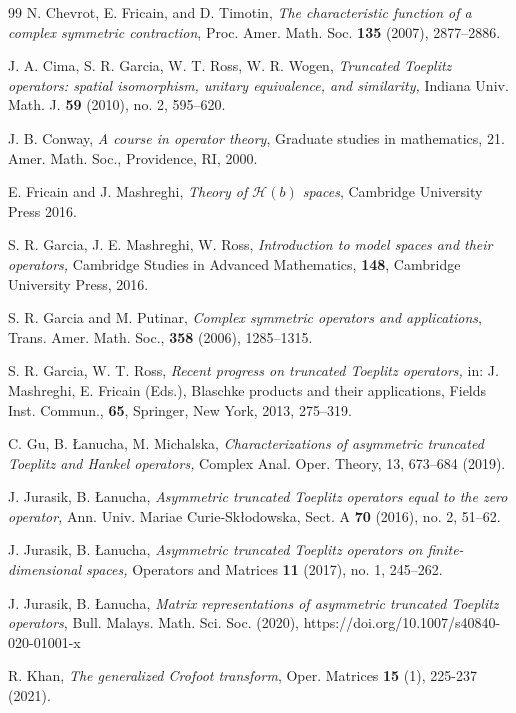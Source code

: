 \documentclass[12pt]{amsart}
\numberwithin{equation}{section}
\theoremstyle{definition}
\numberwithin{equation}{section}
\begin{document}
\begin{thebibliography}{99}
{N. Chevrot, E. Fricain, and D. Timotin},
\textit{The characteristic function of a complex symmetric contraction},
Proc. Amer. Math. Soc. {\bf 135} (2007), 2877--2886.





J. A. Cima, S. R. Garcia, W. T. Ross, W. R. Wogen, \emph{Truncated Toeplitz operators:  spatial isomorphism, unitary equivalence, and similarity,} Indiana Univ. Math. J. \textbf{59} (2010), no. 2, 595--620.


{{J. B. Conway}, \textit{A course in operator theory}, Graduate studies in mathematics, 21. Amer. Math. Soc.,
	Providence, RI, 2000.}

 E. Fricain and J. Mashreghi, {\it Theory of $\mathcal{H}(b)$ spaces}, Cambridge University Press 2016.


S. R. Garcia, J. E. Mashreghi, W. Ross, \emph{Introduction to model spaces and their operators,} Cambridge Studies in Advanced Mathematics, \textbf{148}, Cambridge University Press, 2016.

{S. R. Garcia and M. Putinar}, \textit{Complex symmetric operators and applications}, Trans. Amer. Math. Soc., {\bf 358} (2006), 1285--1315.

S. R. Garcia, W. T. Ross, \textit{Recent progress on truncated Toeplitz operators,} in: J. Mashreghi, E. Fricain (Eds.), Blaschke products and their applications, Fields Inst. Commun., \textbf{65}, Springer, New York, 2013, 275--319.


C. Gu, B. \L anucha, M. Michalska, \textit{Characterizations of asymmetric
	truncated Toeplitz and Hankel operators,} Complex Anal. Oper. Theory, 13, 673--684 (2019).	

J. Jurasik, B. \L anucha, \textit{Asymmetric truncated Toeplitz operators equal to the zero operator,} Ann. Univ. Mariae Curie-Sk\l odowska, Sect. A \textbf{70} (2016), no. 2, 51--62.

J. Jurasik, B. \L anucha, \textit{Asymmetric truncated Toeplitz operators on finite-dimensional spaces,} Operators and Matrices \textbf{11} (2017), no. 1, 245--262.


J. Jurasik, B. \L anucha, \textit{Matrix representations of asymmetric truncated Toeplitz operators}, Bull. Malays. Math. Sci. Soc. (2020), https://doi.org/10.1007/s40840-020-01001-x

R. Khan, \textit{The generalized Crofoot transform}, Oper. Matrices {\bf15} (1), 225-237 (2021).


\end{thebibliography}
\end{document}
